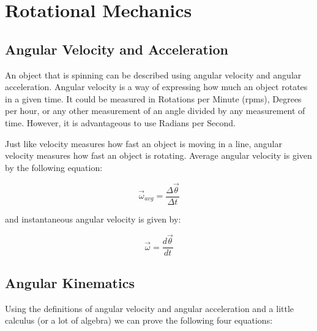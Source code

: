 \chapter{Rotational Mechanics}
	\section{Angular Velocity and Acceleration}
	An object that is spinning can be described using angular velocity and angular acceleration.  Angular velocity is a way of expressing how much an object rotates in a given time.  It could be measured in Rotations per Minute (rpms), Degrees per hour, or any other measurement of an angle divided by any measurement of time.  However, it is advantageous to use Radians per Second.
	
	  Just like velocity measures how fast an object is moving in a line, angular velocity measures how fast an object is rotating.    Average angular velocity is given by the following equation:
	  	\begin{mdframed}[backgroundcolor=orange!20!white]
	  \begin{equation}
		\vec{\omega}_{avg} = \frac{\Delta \vec{\theta}}{\Delta t}
	  \end{equation}
	\end{mdframed}
	and instantaneous angular velocity is given by: 
	  	\begin{mdframed}[backgroundcolor=orange!20!white]
	\begin{equation}
	\vec{\omega} = \frac{d \vec{\theta}}{d t}
	\end{equation}
\end{mdframed}


	\section{Angular Kinematics}
	
	Using the definitions of angular velocity and angular acceleration and a little calculus (or a lot of algebra) we can prove the following four equations:
	
